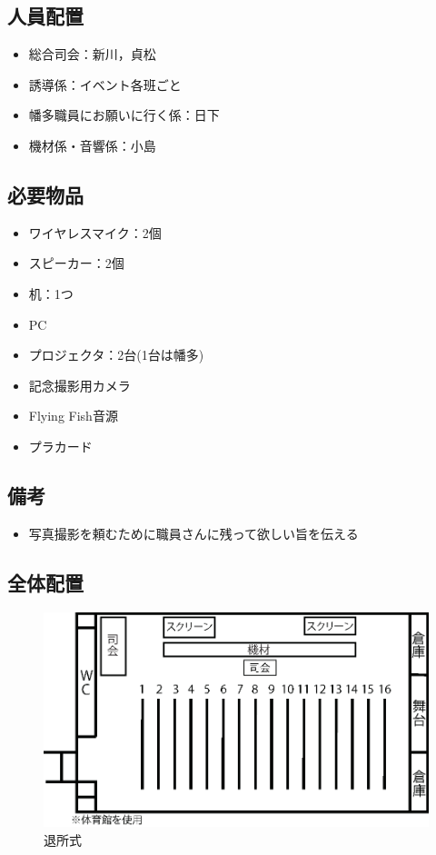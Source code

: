 \subsection{人員配置}
\begin{itemize}
\item 総合司会：新川，貞松
\item 誘導係：イベント各班ごと
\item 幡多職員にお願いに行く係：日下
\item 機材係・音響係：小島
\end{itemize}

\newpage

\subsection{必要物品}
\begin{itemize}
\item ワイヤレスマイク：2個
\item スピーカー：2個
\item 机：1つ
\item PC
\item プロジェクタ：2台(1台は幡多)
\item 記念撮影用カメラ
\item Flying Fish音源
\item プラカード
\end{itemize}
\subsection{備考}
\begin{itemize}
\item 写真撮影を頼むために職員さんに残って欲しい旨を伝える
\end{itemize}

\subsection{全体配置}
\begin{figure}[htbp]
  \begin{center}
  \includegraphics[width = 15cm]{./24/hyousyou.eps}
  \caption{退所式}
  \end{center}
\end{figure}

%
